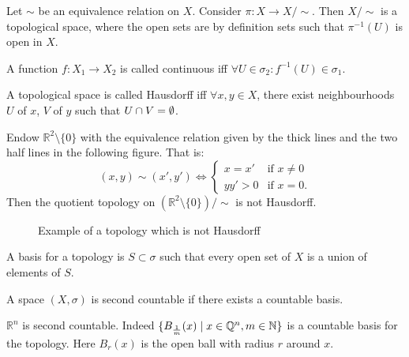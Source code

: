 \begin{definition}
    Let $\sim $ be an equivalence relation on $X$.
    Consider $\pi: X \to  X / \sim $.
    Then $X / \sim $ is a topological space, where the open sets are by definition sets such that $\pi^{-1}(U)$ is open in $X$.
\end{definition}
\begin{definition}
    A function $f: X_1 \to  X_2$ is called continuous iff $\forall  U \in \sigma_2: f ^{-1}(U) \in \sigma_1$.
\end{definition}
\begin{definition}
    A topological space is called Hausdorff iff
    $\forall x, y \in X$, there exist neighbourhoods $U$ of $x$, $V$ of $y$ such that $U \cap V = \emptyset$.
\end{definition}
\begin{eg}
 Endow $\mathbb R^2 \setminus \{0\}$   with the equivalence relation given by the thick lines and the two half lines in the following figure. That is:
    \[
        (x, y) \sim (x', y') \iff \begin{cases}
            x = x' & \text{if $x \neq 0$}\\
            y y' > 0 & \text{if $x = 0$.}
        \end{cases}
    \] 
  Then the quotient topology on $(\mathbb R^2 \setminus \{0\}) / \sim $ is not Hausdorff.
\end{eg}
\begin{figure}[ht]
    \centering
    \caption{Example of a topology which is not Hausdorff}
    \label{fig:not-hausdorff-example}
\end{figure}
\begin{definition}
    A basis for a topology is $S \subset \sigma$ such that every open set of $X$ is a union of elements of $S$.
\end{definition}

\begin{definition}[C2]
    A space $(X, \sigma)$ is second countable if there exists a countable basis.
\end{definition}
\begin{eg}
    $\mathbb R^{n}$ is second countable. 
   Indeed $\{ B_{\frac{1}{m}}(x)  \mid  x \in \mathbb Q^{n}, m \in \mathbb{N}\} $ is a countable basis for the topology. Here $B_{r}(x)$ is the open ball with radius $r$ around $x$.
\end{eg}
